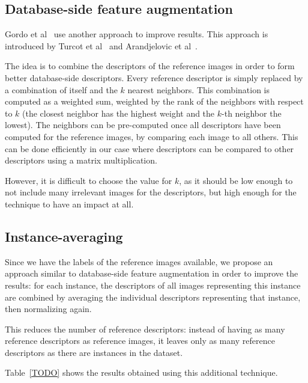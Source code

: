 \subsection{Database-side feature augmentation}
Gordo et al~\cite{gordo_end--end_2016} use another
approach to improve results. This approach is introduced
by Turcot et al~\cite{turcot_better_2009} and
Arandjelovic et al~\cite{arandjelovic_three_2012}.

The idea is to combine the descriptors of the reference
images in order to form better database-side descriptors.
Every reference descriptor is simply replaced by a
combination of itself and the $k$ nearest neighbors.
This combination is computed as a weighted sum, weighted
by the rank of the neighbors with respect to $k$ (the
closest neighbor has the highest weight and the $k$-th
neighbor the lowest).
The neighbors can be pre-computed once all descriptors
have been computed for the reference images, by comparing
each image to all others. This can be done efficiently
in our case where descriptors can be compared to other
descriptors using a matrix multiplication.

However, it is difficult to choose the value for $k$, as
it should be low enough to not include many irrelevant
images for the descriptors, but high enough for the
technique to have an impact at all.

\subsection{Instance-averaging}
Since we have the labels of the reference images
available, we propose an approach similar to
database-side feature augmentation in order to
improve the results: for each instance, the descriptors
of all images representing this instance are combined
by averaging the individual descriptors representing
that instance, then normalizing again.

This reduces the number of reference descriptors:
instead of having as many reference descriptors as
reference images, it leaves only as many reference
descriptors as there are instances in the dataset.

Table~\ref{TODO} shows the results obtained
using this additional technique. %

